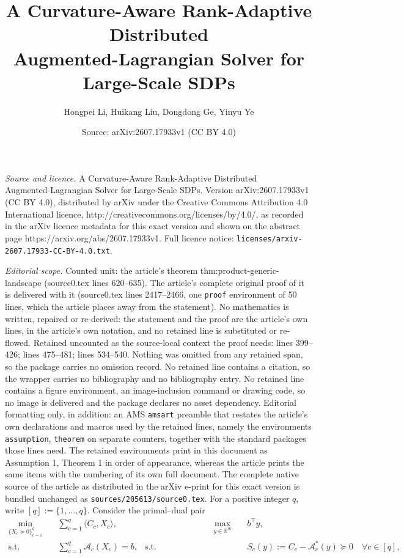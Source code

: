 \documentclass[10pt,a4paper]{amsart}
\title{A Curvature-Aware Rank-Adaptive Distributed\\ Augmented-Lagrangian Solver for Large-Scale SDPs}
\author{Hongpei Li, Huikang Liu, Dongdong Ge, Yinyu Ye}
\date{Source: arXiv:2607.17933v1 (CC BY 4.0)}
\begin{document}
\maketitle

\noindent\emph{Source and licence.} A Curvature-Aware Rank-Adaptive Distributed\\ Augmented-Lagrangian Solver for Large-Scale SDPs. Version arXiv:2607.17933v1 (CC BY 4.0), distributed by arXiv under the Creative Commons Attribution 4.0 International licence, http://creativecommons.org/licenses/by/4.0/, as recorded in the arXiv licence metadata for this exact version and shown on the abstract page https://arxiv.org/abs/2607.17933v1. Full licence notice: \texttt{licenses/arxiv-2607.17933-CC-BY-4.0.txt}.\par\smallskip

\noindent\textit{Editorial scope.} Counted unit: the article's theorem thm:product-generic-landscape (source0.tex lines 620--635). The article's complete original proof of it is delivered with it (source0.tex lines 2417--2466, one \texttt{proof} environment of 50 lines, which the article places away from the statement). No mathematics is written, repaired or re-derived: the statement and the proof are the article's own lines, in the article's own notation, and no retained line is substituted or re-flowed.  Retained uncounted as the source-local context the proof needs: lines 399--426; lines 475--481; lines 534--540.  Nothing was omitted from any retained span, so the package carries no omission record.  No retained line contains a citation, so the wrapper carries no bibliography and no bibliography entry.  No retained line contains a figure environment, an image-inclusion command or drawing code, so no image is delivered and the package declares no asset dependency.  Editorial formatting only, in addition: an AMS \texttt{amsart} preamble that restates the article's own declarations and macros used by the retained lines, namely the environments \texttt{assumption}, \texttt{theorem} on separate counters, together with the standard packages those lines need.  The retained environments print in this document as Assumption 1, Theorem 1 in order of appearance, whereas the article prints the same items with the numbering of its own full document.  The complete native source of the article as distributed in the arXiv e-print for this exact version is bundled unchanged as \texttt{sources/205613/source0.tex}.
For a positive integer $q$, write $[q]:=\{1,\ldots,q\}$.
Consider the primal--dual pair
\begin{equation}
\begin{aligned}
  \min_{\{X_c\succeq0\}_{c=1}^q}\quad
  &\sum_{c=1}^q\langle C_c,X_c\rangle,
  &\qquad \qquad  \qquad \qquad
  \max_{y\in\mathbb R^m}\quad
  &b^\top y,\\
  \text{s.t.}\quad
  &\sum_{c=1}^q\mathcal A_c(X_c)=b,
  &
  \text{s.t.}\quad
  &S_c(y):=C_c-\mathcal A_c^*(y)\succeq0
    \quad \forall c\in[q],
\end{aligned}
\label{eq:product-sdp-theory}
\end{equation}
\end{document}
